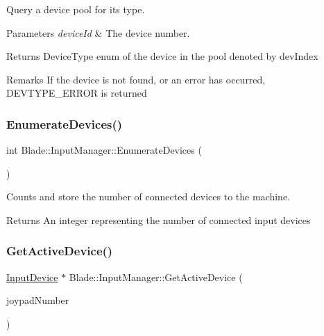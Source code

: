 Query a device pool for its type. 


\begin{DoxyParams}{Parameters}
{\em device\+Id} & The device number. \\
\hline
\end{DoxyParams}
\begin{DoxyReturn}{Returns}
Device\+Type enum of the device in the pool denoted by dev\+Index 
\end{DoxyReturn}
\begin{DoxyRemark}{Remarks}
If the device is not found, or an error has occurred, D\+E\+V\+T\+Y\+P\+E\+\_\+\+E\+R\+R\+OR is returned 
\end{DoxyRemark}
\mbox{\label{class_blade_1_1_input_manager_afdb7935349eacd9dab51a5b06c8d3864}} 
\subsubsection{\texorpdfstring{Enumerate\+Devices()}{EnumerateDevices()}}
{\footnotesize\ttfamily int Blade\+::\+Input\+Manager\+::\+Enumerate\+Devices (\begin{DoxyParamCaption}{ }\end{DoxyParamCaption})\hspace{0.3cm}{\ttfamily [noexcept]}}



Counts and store the number of connected devices to the machine. 

\begin{DoxyReturn}{Returns}
An integer representing the number of connected input devices 
\end{DoxyReturn}
\mbox{\label{class_blade_1_1_input_manager_af7047c9533684d365fb3c61c10911c8c}} 
\subsubsection{\texorpdfstring{Get\+Active\+Device()}{GetActiveDevice()}}
{\footnotesize\ttfamily \hyperlink{class_blade_1_1_input_device}{Input\+Device} $\ast$ Blade\+::\+Input\+Manager\+::\+Get\+Active\+Device (\begin{DoxyParamCaption}\item[{Joypad\+Number}]{joypad\+Number }\end{DoxyParamCaption})}



